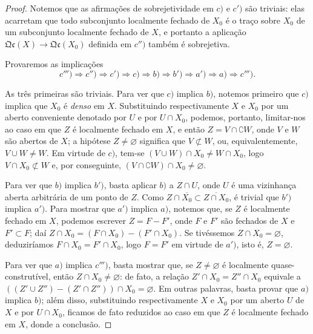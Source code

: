 \begin{proof}
Notemos que as afirmações de sobrejetividade em $c)$ e $c')$ são triviais: elas acarretam que todo subconjunto localmente fechado de $X_0$ é o traço sobre $X_0$ de um subconjunto localmente fechado de $X$, e portanto a aplicação $\mathfrak{Qc}(X)\to\mathfrak{Qc}(X_0)$ definida em $c'')$ também é sobrejetiva.

Provaremos as implicações
\[
  c''')\Rightarrow c'')\Rightarrow c')\Rightarrow c)\Rightarrow b)\Rightarrow b')\Rightarrow a')\Rightarrow a)\Rightarrow c''').
\]

As três primeiras são triviais.
Para ver que $c)$ implica $b)$, notemos primeiro que $c)$ implica que $X_0$ é \emph{denso} em $X$.
Substituindo respectivamente $X$ e $X_0$ por um aberto conveniente denotado por $U$ e por $U\cap X_0$, podemos, portanto, limitar-nos ao caso em que $Z$ é localmente fechado em $X$, e então $Z=V\cap\complement W$, onde $V$ e $W$ são abertos de $X$; a hipótese $Z\neq\varnothing$ significa que $V\not\subset W$, ou, equivalentemente, $V\cup W\neq W$.
Em virtude de $c)$, tem-se $(V\cup W)\cap X_0\neq W\cap X_0$, logo $V\cap X_0\not\subset W$ e, por conseguinte, $(V\cap\complement W)\cap X_0\neq\varnothing$.

Para ver que $b)$ implica $b')$, basta aplicar $b)$ a $Z\cap U$, onde $U$ é uma vizinhança aberta arbitrária de um ponto de $Z$.
Como $Z\cap\overline{X_0}\subset\overline{Z\cap X_0}$, é trivial que $b')$ implica $a')$.
Para mostrar que $a')$ implica $a)$, notemos que, se $Z$ é localmente fechado em $X$, podemos escrever $Z=F-F'$, onde $F$ e $F'$ são fechados de $X$ e $F'\subset F$; daí $Z\cap X_0=(F\cap X_0)-(F'\cap X_0)$.
Se tivéssemos $Z\cap X_0=\varnothing$, deduziríamos $F\cap X_0=F'\cap X_0$, logo $F=F'$ em virtude de $a')$, isto é, $Z=\varnothing$.

Para ver que $a)$ implica $c''')$, basta mostrar que, se $Z\neq\varnothing$ é localmente quase-construtível, então $Z\cap X_0\neq\varnothing$: de fato, a relação $Z'\cap X_0=Z''\cap X_0$ equivale a $((Z'\cup Z'')-(Z'\cap Z''))\cap X_0=\varnothing$.
Em outras palavras, basta provar que $a)$ implica $b)$; além disso, substituindo respectivamente $X$ e $X_0$ por um aberto $U$ de $X$ e por $U\cap X_0$, ficamos de fato reduzidos ao caso em que $Z$ é localmente fechado em $X$, donde a conclusão.


\end{proof}
